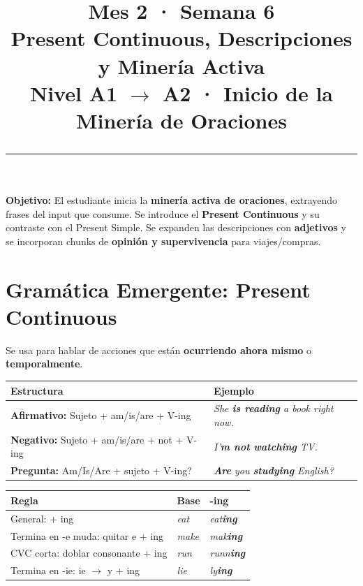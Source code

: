 \documentclass[12pt,a4paper]{article}
\title{%
  \vspace{-1cm}
  {\Huge\bfseries\textcolor{mes2}{Mes 2 · Semana 6}}\\[0.3cm]
  {\Large Present Continuous, Descripciones y Minería Activa}\\[0.2cm]
  {\large\color{grissuave} Nivel A1 $\rightarrow$ A2 · Inicio de la Minería de Oraciones}\\[0.5cm]
  \rule{\textwidth}{1.5pt}
}
\author{}
\date{}
\begin{document}
\maketitle
\thispagestyle{empty}

\begin{cajanivel}
\textbf{Objetivo:} El estudiante inicia la \textbf{minería activa de oraciones}, extrayendo frases del input que consume. Se introduce el \textbf{Present Continuous} y su contraste con el Present Simple. Se expanden las descripciones con \textbf{adjetivos} y se incorporan chunks de \textbf{opinión y supervivencia} para viajes/compras.
\end{cajanivel}

\section{Gramática Emergente: Present Continuous}

\begin{cajagrammar}
Se usa para hablar de acciones que están \textbf{ocurriendo ahora mismo} o \textbf{temporalmente}.

\medskip
\begin{tabularx}{\textwidth}{@{} l X @{}}
\toprule
\textbf{Estructura} & \textbf{Ejemplo} \\
\midrule
\textbf{Afirmativo:} Sujeto + am/is/are + V-ing & \textit{She \textbf{is reading} a book right now.} \\
\textbf{Negativo:} Sujeto + am/is/are + not + V-ing & \textit{I'\textbf{m not watching} TV.} \\
\textbf{Pregunta:} Am/Is/Are + sujeto + V-ing? & \textit{\textbf{Are} you \textbf{studying} English?} \\
\bottomrule
\end{tabularx}

\medskip
\begin{cajaejemplo}
\begin{tabularx}{\textwidth}{@{} l l l @{}}
\textbf{Regla} & \textbf{Base} & \textbf{-ing} \\
\midrule
General: + ing & \textit{eat} & \textit{eat\textbf{ing}} \\
Termina en -e muda: quitar e + ing & \textit{make} & \textit{mak\textbf{ing}} \\
CVC corta: doblar consonante + ing & \textit{run} & \textit{runn\textbf{ing}} \\
Termina en -ie: ie $\rightarrow$ y + ing & \textit{lie} & \textit{ly\textbf{ing}} \\
\end{tabularx}
\end{cajaejemplo}
\end{cajagrammar}
\end{document}
